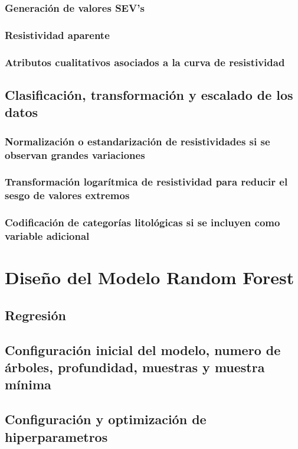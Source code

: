 		\subsubsection{Generación de valores SEV’s}
		
		\subsubsection{Resistividad aparente}
		
		\subsubsection{Atributos cualitativos asociados a la curva de resistividad}


	\subsection{Clasificación, transformación y escalado de los datos}
		\subsubsection{Normalización o estandarización de resistividades si se observan grandes variaciones}
		\subsubsection{Transformación logarítmica de resistividad para reducir el sesgo de valores extremos}
		\subsubsection{Codificación de categorías litológicas si se incluyen como variable adicional}

\section{Diseño del Modelo Random Forest}
	\subsection{Regresión}
	\subsection{Configuración inicial del modelo, numero de árboles, profundidad, muestras y muestra mínima}
	\subsection{Configuración y optimización de hiperparametros}

